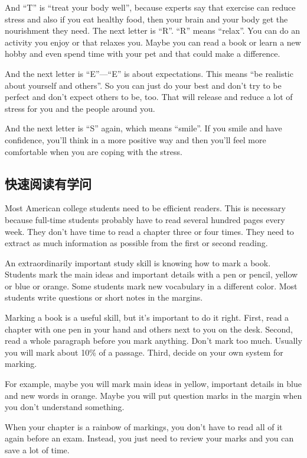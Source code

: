 And “T” is “treat your body well”, because experts say
that exercise can reduce stress and also if you eat healthy
food, then your brain and your body get the nourishment
they need. The next letter is “R”. “R” means “relax”. You
can do an activity you enjoy or that relaxes you. Maybe you 
can read a book or learn a new hobby and even spend time 
with your pet and that could make a difference.

And the next letter is “E”—“E” is about expectations. This
means “be realistic about yourself and others”. So
you can just do your best and don't try to be perfect and
don't expect others to be, too. That will release and reduce
a lot of stress for you and the people around you.


And the next letter is “S” again, which means
“smile”. If you smile and have confidence, you'll think in a
more positive way and then you'll feel more comfortable
when you are coping with the stress.

\subsection{快速阅读有学问}
Most American college students need to be efficient readers.
This is necessary because full-time students probably
have to read several hundred pages every week. They
don't have time to read a chapter three or four times.
They need to extract as much information as possible from
the first or second reading.

An extraordinarily important study skill is knowing how to
mark a book. Students mark the main ideas and important
details with a pen or pencil, yellow or blue or orange.
Some students mark new vocabulary in a different color.
Most students write questions or short notes in the margins.

Marking a book is a useful skill, but it's important to do it
right. First, read a chapter with one pen in your hand and
others next to you on the desk. Second, read a whole
paragraph before you mark anything. Don't mark too
much. Usually you will mark about 10\% of a passage.
Third, decide on your own system for marking.

For example, maybe you will mark main ideas in yellow,
important details in blue and new words in orange. Maybe
you will put question marks in the margin when you don't
understand something.

When your chapter is a rainbow of markings, you don't
have to read all of it again before an exam. Instead,
you just need to review your marks and you can save a lot
of time.
